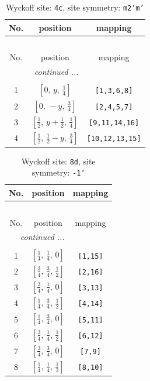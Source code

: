 \documentclass[fleqn,8pt]{jsarticle}
\begin{document}
\renewcommand{\arraystretch}{1.2}
\begin{longtable}{ccc}
\caption{Wyckoff site: {\tt 4c}, site symmetry: {\tt m2'm'}}
 \\
 \hline \hline
No. & position & mapping \\ \hline \endfirsthead

\multicolumn{2}{l}{\tablename\ \thetable{}} \\
 \hline \hline
No. & position & mapping \\ \hline \endhead

 \hline \hline
\multicolumn{2}{r}{\footnotesize\it continued ...} \\ \endfoot

 \hline \hline
\multicolumn{2}{r}{} \\ \endlastfoot

1 & $\left[ 0,\, y,\, \frac{1}{4} \right]$ & {\tt [1,3,6,8]} \\ \hline
2 & $\left[ 0,\, - y,\, \frac{3}{4} \right]$ & {\tt [2,4,5,7]} \\ \hline
3 & $\left[ \frac{1}{2},\, y + \frac{1}{2},\, \frac{1}{4} \right]$ & {\tt [9,11,14,16]} \\ \hline
4 & $\left[ \frac{1}{2},\, \frac{1}{2} - y,\, \frac{3}{4} \right]$ & {\tt [10,12,13,15]} \\
\end{longtable}
\renewcommand{\arraystretch}{1.2}
\begin{longtable}{ccc}
\caption{Wyckoff site: {\tt 8d}, site symmetry: {\tt -1'}}
 \\
 \hline \hline
No. & position & mapping \\ \hline \endfirsthead

\multicolumn{2}{l}{\tablename\ \thetable{}} \\
 \hline \hline
No. & position & mapping \\ \hline \endhead

 \hline \hline
\multicolumn{2}{r}{\footnotesize\it continued ...} \\ \endfoot

 \hline \hline
\multicolumn{2}{r}{} \\ \endlastfoot

1 & $\left[ \frac{1}{4},\, \frac{1}{4},\, 0 \right]$ & {\tt [1,15]} \\ \hline
2 & $\left[ \frac{3}{4},\, \frac{3}{4},\, \frac{1}{2} \right]$ & {\tt [2,16]} \\ \hline
3 & $\left[ \frac{3}{4},\, \frac{1}{4},\, 0 \right]$ & {\tt [3,13]} \\ \hline
4 & $\left[ \frac{1}{4},\, \frac{3}{4},\, \frac{1}{2} \right]$ & {\tt [4,14]} \\ \hline
5 & $\left[ \frac{1}{4},\, \frac{3}{4},\, 0 \right]$ & {\tt [5,11]} \\ \hline
6 & $\left[ \frac{3}{4},\, \frac{1}{4},\, \frac{1}{2} \right]$ & {\tt [6,12]} \\ \hline
7 & $\left[ \frac{3}{4},\, \frac{3}{4},\, 0 \right]$ & {\tt [7,9]} \\ \hline
8 & $\left[ \frac{1}{4},\, \frac{1}{4},\, \frac{1}{2} \right]$ & {\tt [8,10]} \\
\end{longtable}
\end{document}
